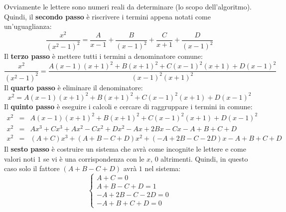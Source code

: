 \documentclass[a4paper]{article}
\begin{document}
	Ovviamente le lettere sono numeri reali da determinare (lo scopo dell'algoritmo). Quindi, il \textbf{secondo passo} è riscrivere i termini appena notati come un'uguaglianza:
	\begin{equation*}
		\dfrac{x^{2}}{\left(x^{2} - 1\right)^{2}} = \dfrac{A}{x-1} + \dfrac{B}{\left(x-1\right)^{2}} + \dfrac{C}{x+1} + \dfrac{D}{\left(x-1\right)^{2}}
	\end{equation*}
	Il \textbf{terzo passo} è mettere tutti i termini a denominatore comune:
	\begin{equation*}
		\dfrac{x^{2}}{\left(x^{2} - 1\right)^{2}} = \dfrac{
			A\left(x-1\right)\left(x+1\right)^{2} +
			B\left(x+1\right)^{2} +
			C\left(x-1\right)^{2}\left(x+1\right) +
			D\left(x-1\right)^{2}
		}{
			\left(x-1\right)^{2}\left(x+1\right)^{2}
		}
	\end{equation*}
	Il \textbf{quarto passo} è eliminare il denominatore:
	\begin{equation*}
		x^{2} = A\left(x-1\right)\left(x+1\right)^{2} +
		B\left(x+1\right)^{2} +
		C\left(x-1\right)^{2}\left(x+1\right) +
		D\left(x-1\right)^{2}
	\end{equation*}
	Il \textbf{quinto passo} è eseguire i calcoli e cercare di raggruppare i termini in comune:
	\begin{equation*}
		\begin{array}{rcl}
			x^{2} &=& A\left(x-1\right)\left(x+1\right)^{2} + B\left(x+1\right)^{2} + C\left(x-1\right)^{2}\left(x+1\right) + D\left(x-1\right)^{2} \\ [1em]
			x^{2} &=& Ax^{3} + Cx^{3} + Ax^{2} - Cx^{2} + Dx^{2} - Ax + 2Bx - Cx - A + B + C + D \\ [1em]
			x^{2} &=& \left(A+C\right)x^{3} + \left(A+B-C+D\right) x^{2} + \left(-A+2B-C-2D\right)x - A+B+C+D
		\end{array}
	\end{equation*}
	Il \textbf{sesto passo} è costruire un sistema che avrà come incognite le lettere e come valori noti $1$ se vi è una corrispondenza con le $x$, $0$ altrimenti. Quindi, in questo caso solo il fattore $\left(A+B-C+D\right)$ avrà $1$ nel sistema:
	\begin{equation*}
		\begin{cases}
			A+C = 0 \\
			A+B-C+D = 1 \\
			-A+2B-C-2D = 0 \\
			-A +B +C +D = 0
		\end{cases}
	\end{equation*}
\end{document}
